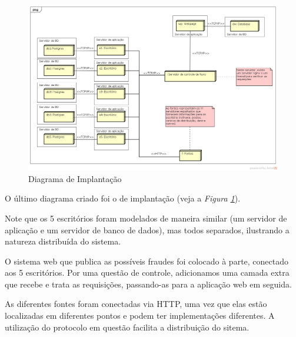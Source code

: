 \documentclass[a4paper,10pt]{article}
\begin{document}
\begin{figure}[ht]
  \centering
  \includegraphics[width=1\textwidth, keepaspectratio=true]{images/implantacao.png}
  \caption {Diagrama de Implantação}
  \label {di}
\end{figure}

O último diagrama criado foi o de implantação (veja a \emph{Figura \ref{di}}). \par

Note que os 5 escritórios foram modelados de maneira similar (um servidor de
aplicação e um servidor de banco de dados), mas todos separados, ilustrando a
natureza distribuída do sistema. \par

O sistema web que publica as possíveis fraudes foi colocado à parte, conectado
aos 5 escritórios. Por uma questão de controle, adicionamos uma camada extra
que recebe e trata as requisições, passando-as para a aplicação web em seguida. \par

As diferentes fontes foram conectadas via HTTP, uma vez que elas estão
localizadas em diferentes pontos e podem ter implementações diferentes.
A utilização do protocolo em questão facilita a distribuição do sitema.

\end{document}

